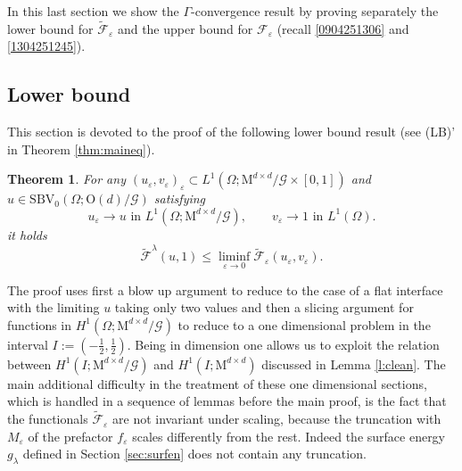 \documentclass[a4paper,reqno]{amsart}
\newtheorem{theorem}[definition]{Theorem}
\theoremstyle{remark}
\def\e{\varepsilon}
\newcommand{\F}{\mathcal{F}}
\newcommand{\G}{\mathcal{G}}
\newcommand{\tF}{\widetilde{\F}}
\newcommand{\On}{\mathrm{O}(d)}
\newcommand{\Mno}{\mathrm{M}^{d\times d}}
\newcommand{\PC}{\mathrm{SBV}_0}
\newcommand\uu{{u}}
\numberwithin{equation}{section}
\begin{document}
In this last section we show the $\Gamma$-convergence result by proving separately the lower bound for $\tF_\e$ and the upper bound for $\F_\e$  (recall \eqref{0904251306} and \eqref{1304251245}).


\subsection{Lower bound}\label{subsec:liminf}

This section is devoted to the proof of the following lower bound result (see (LB)' in Theorem \ref{thm:maineq}).

\begin{theorem}\label{th-lb}
	For any $(u_\varepsilon, v_\varepsilon)_\varepsilon
	\subset L^1(\Omega;\Mno/\G\times [0,1])$ and $u \in \PC(\Omega; \On/\G)$ satisfying
\[
	u_\varepsilon \to u \text{ in }L^1(\Omega; \Mno/\G),\qquad v_\varepsilon \to 1 \text{ in }L^1(\Omega).
\]
	it holds
	\begin{equation*}
		\tF^\lambda(\uu,1)\leq \liminf_{\varepsilon\to 0} \tF_\varepsilon(\uu_\e, v_\varepsilon).
	\end{equation*} 
\end{theorem}
The proof uses first a blow up argument to reduce to the case of a flat interface with the limiting $\uu$ taking only two values and then a slicing argument for functions in $H^1(\Omega;\Mno/\G)$ to reduce to a one dimensional problem in the interval
$I:=\left(-\frac 12, \frac 12 \right)$. Being in dimension one allows us to exploit the relation between $H^1(I;\Mno/\G)$ and $H^1(I;\Mno)$ discussed in Lemma \ref{l:clean}. The main additional difficulty in the treatment of  these one dimensional sections, which is handled  in a sequence of lemmas before the main proof, is the fact that the functionals $\tF_\e$ are not invariant under scaling, because the truncation with $M_\e$ of the prefactor $f_\e$ scales differently from the rest. Indeed the surface energy $g_\lambda$ defined in Section \ref{sec:surfen} does not contain any truncation.
\end{document}
